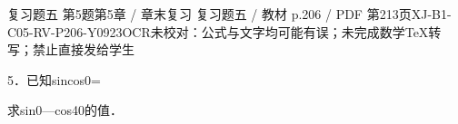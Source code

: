\begin{bankitem}{复习题五 第5题}{第5章 / 章末复习 复习题五 / 教材 p.206 / PDF 第213页}{XJ-B1-C05-RV-P206-Y0923}{OCR未校对：公式与文字均可能有误；未完成数学TeX转写；禁止直接发给学生}
\begin{ocrdraft}
\par
5．已知sincos0=
\par
求sin0—cos40的值．
\end{ocrdraft}
\end{bankitem}
